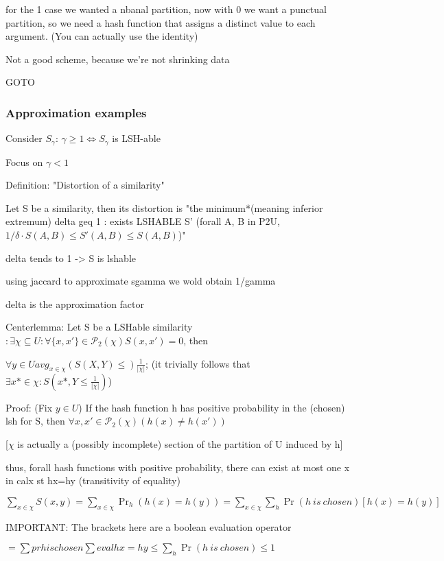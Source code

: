 	for the 1 case we wanted a nbanal partition, now with 0 we want a punctual partition, so we need a hash function that assigns a distinct value to each argument. (You can actually use the identity)
	
	Not a good scheme, because we're not shrinking data
	
	GOTO %
	
\subsubsection{Approximation examples}
	
	Consider $S_\gamma$: $\gamma \geq 1 \Leftrightarrow S_\gamma$ is LSH-able
	
	Focus on $\gamma < 1$
	
	Definition: "Distortion of a similarity"
	
	Let S be a similarity, then its distortion is "the minimum*(meaning inferior extremum) delta geq 1 : exists LSHABLE S' (forall {A, B} in P2U, $1/\delta \cdot S(A, B) \leq S'(A, B) \leq S(A, B)$)"
	
	delta tends to 1 -> S is lshable
	
	using jaccard to approximate sgamma we wold obtain 1/gamma
	
	delta is the approximation factor
	
	
	Centerlemma: Let S be a LSHable similarity $ : \exists \chi \subseteq U : \forall \{x, x'\} \in \mathcal{P}_2(\chi) S(x, x')=0$, then
	
	$\forall y \in U avg_{x \in \chi}(S(X, Y) \leq) \frac{1}{|\chi|}$; (it trivially follows that $\exists x* \in \chi : S(x*, Y \leq \frac{1}{|\chi|})$)
	
	Proof: (Fix $y \in U$) If the hash function h has positive probability in the (chosen) lsh for S, then $\forall {x, x'} \in \mathcal{P}_2(\chi) (h(x)\neq h(x'))$
	
	[$\chi$ is actually a (possibly incomplete) section of the partition of U induced by h]
	
	thus, forall hash functions with positive probability, there can exist at most one x in calx st hx=hy (transitivity of equality)
	
	$\sum_{x \in \chi}S(x, y) = \sum_{x \in \chi}\Pr_h(h(x)=h(y)) = \sum_{x \in \chi}\sum_{h}\Pr(h\ is\ chosen)[h(x)=h(y)]$
	
	IMPORTANT: The brackets here are a boolean evaluation operator
	
	$= \sum pr h is chosen \sum eval hx = hy \leq \sum_h \Pr(h\ is\ chosen) \leq 1$
	

